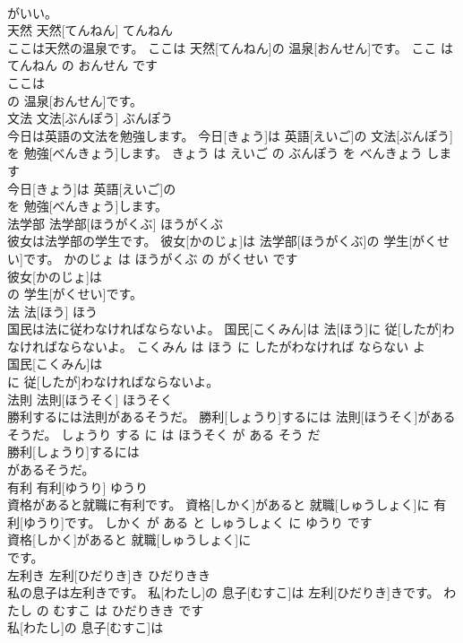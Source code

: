 \documentclass[8pt]{extreport}
\begin{document}
\begin{CJK}{UTF8}{min}
\\	がいい。			
\\	天然	天然[てんねん]	てんねん	
\\	ここは天然の温泉です。	ここは 天然[てんねん]の 温泉[おんせん]です。	ここ は てんねん の おんせん です	
\\	ここは
\\	の 温泉[おんせん]です。			
\\	文法	文法[ぶんぽう]	ぶんぽう	
\\	今日は英語の文法を勉強します。	今日[きょう]は 英語[えいご]の 文法[ぶんぽう]を 勉強[べんきょう]します。	きょう は えいご の ぶんぽう を べんきょう します	
\\	今日[きょう]は 英語[えいご]の
\\	を 勉強[べんきょう]します。			
\\	法学部	法学部[ほうがくぶ]	ほうがくぶ	
\\	彼女は法学部の学生です。	彼女[かのじょ]は 法学部[ほうがくぶ]の 学生[がくせい]です。	かのじょ は ほうがくぶ の がくせい です	
\\	彼女[かのじょ]は
\\	の 学生[がくせい]です。			
\\	法	法[ほう]	ほう	
\\	国民は法に従わなければならないよ。	国民[こくみん]は 法[ほう]に 従[したが]わなければならないよ。	こくみん は ほう に したがわなければ ならない よ	
\\	国民[こくみん]は
\\	に 従[したが]わなければならないよ。			
\\	法則	法則[ほうそく]	ほうそく	
\\	勝利するには法則があるそうだ。	勝利[しょうり]するには 法則[ほうそく]があるそうだ。	しょうり する に は ほうそく が ある そう だ	
\\	勝利[しょうり]するには
\\	があるそうだ。			
\\	有利	有利[ゆうり]	ゆうり	
\\	資格があると就職に有利です。	資格[しかく]があると 就職[しゅうしょく]に 有利[ゆうり]です。	しかく が ある と しゅうしょく に ゆうり です	
\\	資格[しかく]があると 就職[しゅうしょく]に
\\	です。			
\\	左利き	左利[ひだりき]き	ひだりきき	
\\	私の息子は左利きです。	私[わたし]の 息子[むすこ]は 左利[ひだりき]きです。	わたし の むすこ は ひだりきき です	
\\	私[わたし]の 息子[むすこ]は

\end{CJK}
\end{document}
